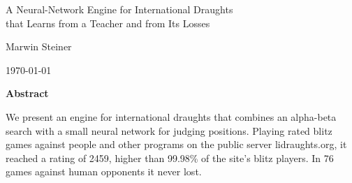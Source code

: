 \documentclass[11pt,a4paper]{article}
\begin{document}
\begin{titlepage}
  \centering
  \vspace*{3cm}
  {\LARGE A Neural-Network Engine for International Draughts\\[0.3em]
  that Learns from a Teacher and from Its Losses\par}
  \vspace{1.5cm}
  {\large Marwin Steiner\par}
  \vspace{0.5cm}
  {\large \today\par}
  \vspace{2cm}
  \begin{minipage}{0.85\textwidth}
    \centering \textbf{Abstract}\\[0.5em]
    \raggedright
    We present an engine for international draughts that combines an alpha-beta
    search with a small neural network for judging positions. Playing rated blitz
    games against people and other programs on the public server lidraughts.org,
    it reached a rating of 2459, higher than 99.98\% of the site's blitz players.
    In 76 games against human opponents it never lost.
  \end{minipage}
  \vfill
\end{titlepage}

\tableofcontents
\clearpage








\clearpage
{}
{}
\printbibliography[title={References}]
\end{document}
